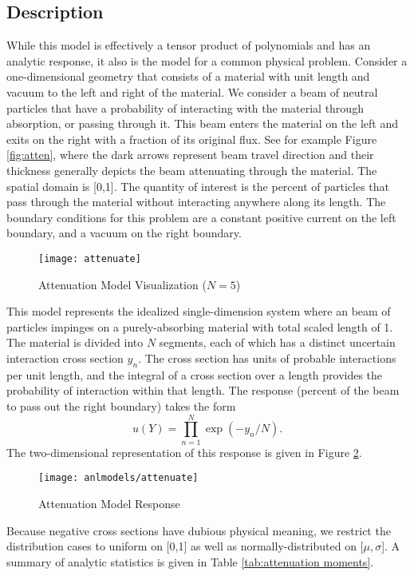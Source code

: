 \subsection{Description}\label{mod:attenuation}
While this model is effectively a tensor product of polynomials and has an analytic response, 
it also is the model for a common physical problem.
Consider a one-dimensional geometry that consists of a material with unit length and vacuum to the left and
right of the material.  We consider a beam of neutral particles that have a probability of interacting
with the material through absorption, or passing through it.  This beam enters the material on the left
and exits on the right with a fraction of its original flux.  See for example Figure \ref{fig:atten}, where
the dark arrows represent beam travel direction and their thickness generally depicts the beam attenuating
through the material.  The spatial domain is [0,1].
The quantity of interest is the percent of particles that pass through the material without interacting
anywhere along its length.  The boundary conditions for this problem are a constant positive current on the 
left boundary, and a vacuum on the right boundary.
\begin{figure}[htb]
  \centering
  \texttt{[image: attenuate]}
  \caption{Attenuation Model Visualization ($N=5$)}
  \label{fig: atten}
\end{figure}

This model represents the idealized single-dimension system where an beam of particles impinges on a
purely-absorbing material with total scaled length of 1.
The material is divided into $N$ segments, each of which
has a distinct uncertain interaction cross section $y_n$.  The cross section has units of probable interactions
per unit length, and the integral of a cross section over a length provides the probability of interaction
within that length.  The response (percent of the beam to pass out the right boundary) takes the form
\begin{equation}
  u(Y) = \prod_{n=1}^N \exp(-y_n/N).
\end{equation}
The two-dimensional representation of this response is given in Figure \ref{fig: attenuation}.
\begin{figure}[htb]
  \centering
  \texttt{[image: anlmodels/attenuate]}
  \caption{Attenuation Model Response}
  \label{fig: attenuation}
\end{figure}
Because negative cross sections have dubious physical meaning, we restrict the distribution cases to uniform
on [0,1] as well as normally-distributed on [$\mu,\sigma$].  A summary of analytic statistics is given in
Table \ref{tab:attenuation moments}.

